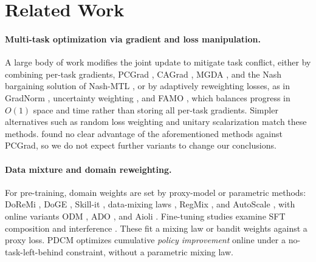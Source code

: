 \vspace{-0.05in}
\section{Related Work}
\label{sec:related_work}
\vspace{-0.1in}

\paragraph{Multi-task optimization via gradient and loss manipulation.}
A large body of work modifies the joint update to mitigate task conflict, either by
combining per-task gradients, PCGrad \citep{pcgrad2020}, CAGrad \citep{cagrad2021},
MGDA \citep{sener2018mgda}, and the Nash bargaining solution of Nash-MTL 
\citep{nash-mtl2022}, or by adaptively reweighting losses, as in GradNorm
\citep{chen2018gradnormgradientnormalizationadaptive}, uncertainty weighting \citep{kendall2018multitasklearningusinguncertainty}, and FAMO
\citep{liu2023famofastadaptivemultitask}, which balances progress in $O(1)$ space and time rather than storing
all per-task gradients. Simpler alternatives such as random loss weighting
\citep{lin2022reasonableeffectivenessrandomweighting} and unitary scalarization \citep{unitary2022kurin} match these
methods. \citep{unitary2022kurin} found no clear advantage of the aforementioned methods against PCGrad, so we do not expect further variants to
change our conclusions.

\vspace{-0.1in}
\paragraph{Data mixture and domain reweighting.}
For pre-training, domain weights are set by proxy-model or parametric methods: DoReMi
\citep{xie2023doremioptimizingdatamixtures}, DoGE \citep{fan2024dogedomainreweightinggeneralization}, Skill-it \citep{chen2023skillitdatadrivenskillsframework},
data-mixing laws \citep{li2025datamixingoptimizationsupervised}, RegMix \citep{liu2025regmixdatamixtureregression},  and AutoScale
\citep{kang2025autoscalescaleawaredatamixing}, with online variants ODM \citep{albalak2023efficientonlinedatamixing},  ADO
\citep{jiang2024adaptivedataoptimizationdynamic}, and Aioli \citep{chen2025aioli}. Fine-tuning studies examine SFT
composition and interference \citep{dong-etal-2024-abilities}. These fit a mixing law or
bandit weights against a proxy loss. PDCM optimizes cumulative \emph{policy improvement}
online under a no-task-left-behind constraint, without a parametric mixing law.

